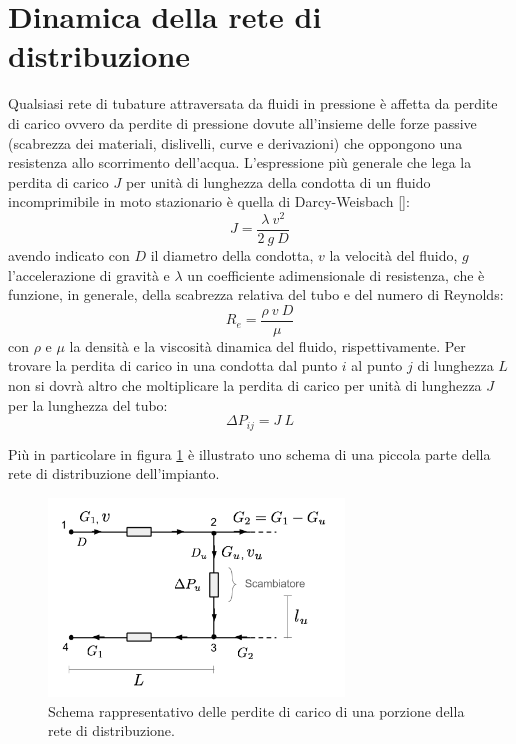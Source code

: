 \documentclass[laurea,oneside,11pt]{USiena_tesiLM}
\begin{document}
\section{Dinamica della rete di distribuzione}
Qualsiasi rete di tubature attraversata da fluidi in pressione è affetta da perdite di carico ovvero da perdite di pressione dovute all'insieme delle forze passive (scabrezza dei materiali, dislivelli, curve e derivazioni) che oppongono una resistenza allo scorrimento dell'acqua. L'espressione più generale che lega la perdita di carico $J$ per unità di lunghezza della condotta di un fluido incomprimibile in moto stazionario è quella di Darcy-Weisbach [\cite{darcy}]:
\begin{equation}
J = \frac{\lambda \ v^2}{2 \ g \ D}
\end{equation}
avendo indicato con $D$ il diametro della condotta, $v$ la velocità del fluido, $g$ l'accelerazione di gravità e $\lambda$ un coefficiente adimensionale di resistenza, che è funzione, in generale, della scabrezza relativa del tubo e del numero di Reynolds:
\begin{equation}
R_e = \frac{\rho \ v \ D}{\mu}
\end{equation}
con $\rho$ e $\mu$ la densità e la viscosità dinamica del fluido, rispettivamente. 
Per trovare la perdita di carico in una condotta dal punto $i$ al punto $j$ di lunghezza $L$ non si dovrà altro che moltiplicare la perdita di carico per unità di lunghezza $J$ per la lunghezza del tubo:
\begin{equation}
\Delta P_{ij} = J \ L
\end{equation} 
 
Più in particolare in figura \ref{fig:perdite_carico} è illustrato uno schema di una piccola parte della rete di distribuzione dell'impianto.

\begin{figure}[h]
\centering
\includegraphics[width=0.70\textwidth]{figure/perdite_carico} %
\caption{Schema rappresentativo delle perdite di carico di una porzione della rete di distribuzione.}
\label{fig:perdite_carico}

\end{figure}
\end{document}

